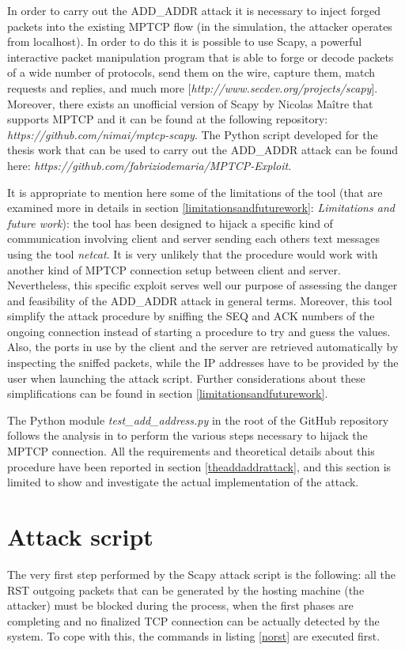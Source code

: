 In order to carry out the ADD\_ADDR attack it is necessary to inject forged packets into the existing MPTCP flow (in the simulation, the attacker operates from localhost). In order to do this it is possible to use Scapy, a powerful interactive packet manipulation program that is able to forge or decode packets of a wide number of protocols, send them on the wire, capture them, match requests and replies, and much more [\textit{http://www.secdev.org/projects/scapy}]. Moreover, there exists an unofficial version of Scapy by Nicolas Maître that supports MPTCP and it can be found at the following repository: \textit{https://github.com/nimai/mptcp-scapy}. The Python script developed for the thesis work that can be used to carry out the ADD\_ADDR attack can be found here: \textit{https://github.com/fabriziodemaria/MPTCP-Exploit}. 

It is appropriate to mention here some of the limitations of the tool (that are examined more in details in section \ref{limitationsandfuturework}: \textit{Limitations and future work}): the tool has been designed to hijack a specific kind of communication involving client and server sending each others text messages using the tool \textit{netcat}. It is very unlikely that the procedure would work with another kind of MPTCP connection setup between client and server. Nevertheless, this specific exploit serves well our purpose of assessing the danger and feasibility of the ADD\_ADDR attack in general terms.
Moreover, this tool simplify the attack procedure by sniffing the SEQ and ACK numbers of the ongoing connection instead of starting a procedure to try and guess the values. Also, the ports in use by the client and the server are retrieved automatically by inspecting the sniffed packets, while the IP addresses have to be provided by the user when launching the attack script. Further considerations about these simplifications can be found in section \ref{limitationsandfuturework}.

The Python module \textit{test\_add\_address.py} in the root of the GitHub repository follows the analysis in  to perform the various steps necessary to hijack the MPTCP connection. All the requirements and theoretical details about this procedure have been reported in section \ref{theaddaddrattack}, and this section is limited to show and investigate the actual implementation of the attack.

\section{Attack script}
The very first step performed by the Scapy attack script is the following: all the RST outgoing packets that can be generated by the hosting machine (the attacker) must be blocked during the process, when the first phases are completing and no finalized TCP connection can be actually detected by the system. To cope with this, the commands in listing \ref{norst} are executed first.


